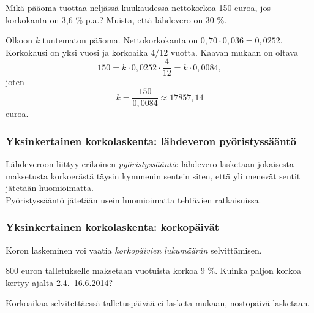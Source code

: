 \documentclass[]{beamer}
\newcommand{\pblock}{\\ \vspace{0.5cm}\pause}
\begin{document}
\begin{frame}
    \begin{esim}
        Mikä pääoma tuottaa neljässä kuukaudessa nettokorkoa 150 euroa, jos korkokanta on 3{,}6 \% p.a.? Muista, että lähdevero on 30 \%.
    \end{esim}\pause
    \begin{ratkaisu}
        Olkoon \(k\) tuntematon pääoma. \pause Nettokorkokanta on \(0,70\cdot0,036 = 0,0252\).
        \pause Korkokausi on yksi vuosi ja korkoaika 4/12 vuotta.
        \pause Kaavan mukaan on oltava
        \[
            150 = k\cdot 0,0252\cdot \frac{4}{12} = k\cdot 0,0084,
        \]
        \pause
        joten
        \[
            k = \frac{150}{0,0084}\approx 17857,14
        \]
        euroa.
    \end{ratkaisu}
\end{frame}

\begin{frame}
    \frametitle{Yksinkertainen korkolaskenta: lähdeveron pyöristyssääntö}
    \pause
    \pause
    Lähdeveroon liittyy erikoinen \emph{pyöristyssääntö}:
    lähdevero lasketaan jokaisesta maksetusta korkoerästä täysin kymmenin sentein siten,
    että yli menevät sentit jätetään huomioimatta.
    \pblock
    Pyöristyssääntö jätetään usein huomioimatta tehtävien ratkaisuissa.
\end{frame}

\begin{frame}
    \frametitle{Yksinkertainen korkolaskenta: korkopäivät}
    \pause
    Koron laskeminen voi vaatia \emph{korkopäivien lukumäärän} selvittämisen.
    \pause
    \begin{esim}
        800 euron talletukselle maksetaan vuotuista korkoa 9 \%. Kuinka paljon korkoa kertyy ajalta 2.4.--16.6.2014?
    \end{esim}
    \pause
    Korkoaikaa selvitettäessä talletuspäivää ei lasketa mukaan, nostopäivä lasketaan.
\end{frame}
\end{document}
